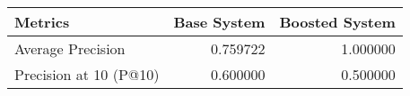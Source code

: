 \begin{tabular}{lrr}
\toprule
Metrics & Base System & Boosted System \\
\midrule
Average Precision & 0.759722 & 1.000000 \\
Precision at 10 (P@10) & 0.600000 & 0.500000 \\
\bottomrule
\end{tabular}

